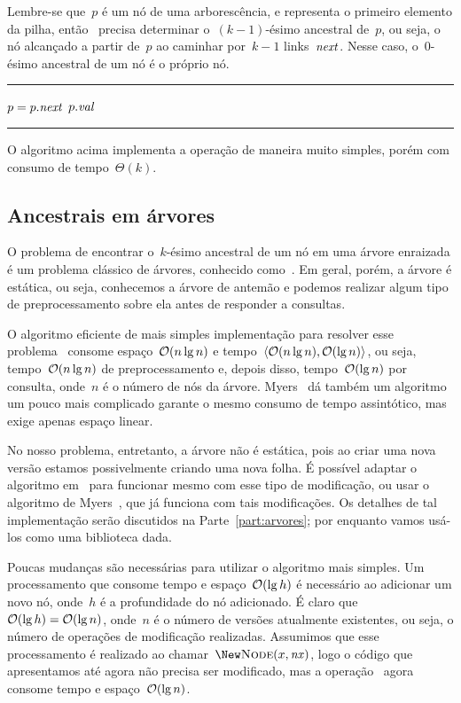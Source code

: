 \documentclass[main.tex]{subfiles}
\begin{document}
Lembre-se que~$p$ é um nó de uma arborescência, e representa o primeiro elemento da pilha, então~ precisa determinar o~$(k-1)$-ésimo ancestral de~$p$, ou seja, o nó alcançado a partir de~$p$ ao caminhar por~$k - 1$ links~$\mathit{next}$. Nesse caso, o~0-ésimo ancestral de um nó é o próprio nó. \\

\hrule
\begin{algorithmic}[1]
        \State $p = p.\mathit{next}$
    \EndFor
    \State \Return $p.\mathit{val}$
\EndFunction
\end{algorithmic}
\hrule
\vspace{1em}

O algoritmo acima implementa a operação de maneira muito simples, porém com consumo de tempo~$\Theta(k)$.

\subsection{Ancestrais em árvores}

O problema de encontrar o~$k$-ésimo ancestral de um nó em uma árvore enraizada é um problema clássico de árvores, conhecido como~. Em geral, porém, a árvore é estática, ou seja, conhecemos a árvore de antemão e podemos realizar algum tipo de preprocessamento sobre ela antes de responder a consultas.

O algoritmo eficiente de mais simples implementação para resolver esse problema~\cite{BenderM-F2004} consome espaço~$\mathcal{O}(n \lg n)$ e tempo~${\langle\mathcal{O}(n \lg n), \mathcal{O}(\lg n)\rangle}$, ou seja, tempo~$\mathcal{O}(n \lg n)$ de preprocessamento e, depois disso, tempo~$\mathcal{O}(\lg n)$ por consulta, onde~$n$ é o número de nós da árvore. Myers~\cite{Myers83} dá também um algoritmo um pouco mais complicado garante o mesmo consumo de tempo assintótico, mas exige apenas espaço linear.

No nosso problema, entretanto, a árvore não é estática, pois ao criar uma nova versão estamos possivelmente criando uma nova folha. É possível adaptar o algoritmo em~\cite{BenderM-F2004} para funcionar mesmo com esse tipo de modificação, ou usar o algoritmo de Myers~\cite{Myers83}, que já funciona com tais modificações. Os detalhes de tal implementação serão discutidos na Parte~\ref{part:arvores}; por enquanto vamos usá-los como uma biblioteca dada.

Poucas mudanças são necessárias para utilizar o algoritmo mais simples. Um processamento que consome tempo e espaço~$\mathcal{O}(\lg h)$ é necessário ao adicionar um novo nó, onde~$h$ é a profundidade do nó adicionado. É claro que~$\mathcal{O}(\lg h) = \mathcal{O}(\lg n)$, onde~$n$ é o número de versões atualmente existentes, ou seja, o número de operações de modificação realizadas. Assumimos que esse processamento é realizado ao chamar~$\New \Call{Node}{x, \V{nx}}$, logo o código que apresentamos até agora não precisa ser modificado, mas a operação~ agora consome tempo e espaço~$\mathcal{O}(\lg n)$.
\end{document}
